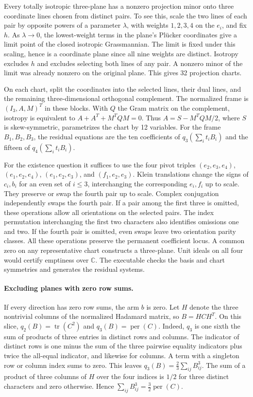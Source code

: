 Every totally isotropic three-plane has a nonzero projection minor
onto three coordinate lines chosen from distinct pairs. To see this,
scale the two lines of each pair by opposite powers of a parameter
\(\lambda\), with weights \(1,2,3,4\) on the \(e_i\), and fix \(h\).
As \(\lambda\to0\), the lowest-weight terms in the plane's Pl\"ucker
coordinates give a limit point of the closed isotropic Grassmannian.
The limit is fixed under this scaling, hence is a coordinate plane
since all nine weights are distinct. Isotropy excludes \(h\) and excludes
selecting both lines of any pair. A nonzero minor of the limit was
already nonzero on the original plane. This gives 32 projection charts.

On each chart, split the coordinates into the selected lines, their
dual lines, and the remaining three-dimensional orthogonal complement.
The normalized frame is \((I_3,A,M)^T\) in these blocks. With \(Q\) the
Gram matrix on the complement, isotropy is equivalent to
\(A+A^T+M^TQM=0\). Thus \(A=S-M^TQM/2\), where \(S\) is skew-symmetric,
parametrizes the chart by 12 variables. For the frame \(B_1,B_2,B_3\),
the residual equations are the ten coefficients of
\(q_3(\sum_i t_i B_i)\) and the fifteen of \(q_4(\sum_i t_i B_i)\).

For the existence question it suffices to use the four pivot triples
\((e_2,e_3,e_4)\), \((e_1,e_2,e_4)\), \((e_1,e_2,e_3)\), and
\((f_1,e_2,e_3)\). Klein translations change the signs of \(c_i,b_i\)
for an even set of \(i\le3\), interchanging the corresponding \(e_i,f_i\)
up to scale. They preserve or swap the fourth pair up to scale.
Complex conjugation independently swaps the fourth pair. If a pair
among the first three is omitted, these operations allow all orientations
on the selected pairs. The index permutation interchanging the first two
characters also identifies omissions one and two. If the fourth pair
is omitted, even swaps leave two orientation parity classes.
All these operations preserve the permanent coefficient locus.
A common zero on any representative chart constructs a three-plane.
Unit ideals on all four would certify emptiness over \(\mathbb C\).
The executable checks the basis and chart symmetries and generates
the residual systems.

\paragraph{Excluding planes with zero row sums.}
If every direction has zero row sums, the arm \(b\) is zero. Let \(H\)
denote the three nontrivial columns of the normalized Hadamard matrix,
so \(B=HCH^T\). On this slice, \(q_2(B)=\operatorname{tr}(C^2)\) and
\(q_3(B)=\operatorname{per}(C)\). Indeed, \(q_3\) is one sixth the sum of
products of three entries in distinct rows and columns. The indicator
of distinct rows is one minus the sum of the three pairwise equality
indicators plus twice the all-equal indicator, and likewise for columns.
A term with a singleton row or column index sums to zero. This leaves
\(q_3(B)=\tfrac23\sum_{ij}B_{ij}^3\). The sum of a product of three
columns of \(H\) over the four indices is \(1/2\) for three distinct
characters and zero otherwise. Hence \(\sum_{ij}B_{ij}^3=\tfrac32
\operatorname{per}(C)\).

